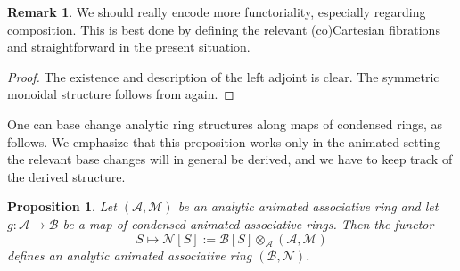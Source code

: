 \documentclass[11pt]{amsbook}
\numberwithin{equation}{section}
\numberwithin{theorem}{section}
\newtheorem{proposition}[theorem]{Proposition}
\theoremstyle{definition}
\newtheorem{remark}[theorem]{Remark}
\begin{document}
\begin{remark} We should really encode more functoriality, especially regarding composition. This is best done by defining the relevant (co)Cartesian fibrations and straightforward in the present situation.
\end{remark}

\begin{proof} The existence and description of the left adjoint is clear. The symmetric monoidal structure follows from \cite[Theorem I.3.6]{NikolausScholze} again.
\end{proof}

One can base change analytic ring structures along maps of condensed rings, as follows. We emphasize that this proposition works only in the animated setting -- the relevant base changes will in general be derived, and we have to keep track of the derived structure.

\begin{proposition}\label{prop:inducedanalytic} Let $(\mathcal A,\mathcal M)$ be an analytic animated associative ring and let $g: \mathcal A\to \mathcal B$ be a map of condensed animated associative rings. Then the functor
\[
S\mapsto \mathcal N[S]:=\mathcal B[S]\otimes_{\mathcal A} (\mathcal A,\mathcal M)
\]
defines an analytic animated associative ring $(\mathcal B,\mathcal N)$.
\end{proposition}
\end{document}
